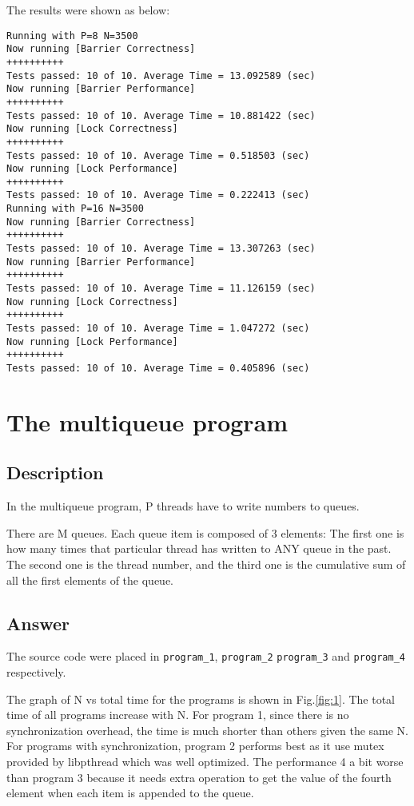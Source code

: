 \documentclass[12pt]{article}
\begin{document}
The results were shown as below:
\begin{verbatim}
Running with P=8 N=3500
Now running [Barrier Correctness]
++++++++++
Tests passed: 10 of 10. Average Time = 13.092589 (sec)
Now running [Barrier Performance]
++++++++++
Tests passed: 10 of 10. Average Time = 10.881422 (sec)
Now running [Lock Correctness]
++++++++++
Tests passed: 10 of 10. Average Time = 0.518503 (sec)
Now running [Lock Performance]
++++++++++
Tests passed: 10 of 10. Average Time = 0.222413 (sec)
Running with P=16 N=3500
Now running [Barrier Correctness]
++++++++++
Tests passed: 10 of 10. Average Time = 13.307263 (sec)
Now running [Barrier Performance]
++++++++++
Tests passed: 10 of 10. Average Time = 11.126159 (sec)
Now running [Lock Correctness]
++++++++++
Tests passed: 10 of 10. Average Time = 1.047272 (sec)
Now running [Lock Performance]
++++++++++
Tests passed: 10 of 10. Average Time = 0.405896 (sec)
\end{verbatim}

\section{The multiqueue program}
\subsection{Description}
In the multiqueue program, P threads have to write numbers to queues.

There are M queues. Each queue item is composed of 3 elements: The 
first one is how many times that particular thread has written to ANY 
queue in the past. The second one is the thread number, and the third 
one is the cumulative sum of all the first elements of the queue.

\subsection{Answer}
The source code were placed in \texttt{program\_1}, \texttt{program\_2}
\texttt{program\_3} and \texttt{program\_4} respectively.

The graph of N vs total time for the programs is shown in Fig.\ref{fig:1}.
The total time of all programs increase with N. For program 1, since there
is no synchronization overhead, the time is much shorter than others given
the same N. For programs with synchronization, program 2 performs best as it
use mutex provided by libpthread which was well optimized. The performance 4
a bit worse than program 3 because it needs extra operation to get the value
of the fourth element when each item is appended to the queue.
\end{document}
